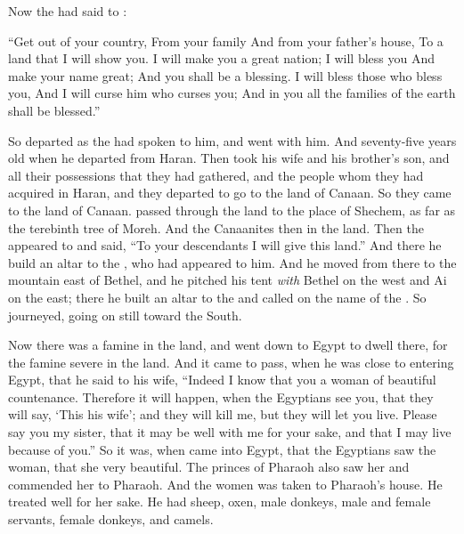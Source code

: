
\bverse Now the \lord had said to :
\begin{bquotation}
``Get out of your country, From your family And from your father's house, To a land that I will show you. \bverse I will make you a great nation; I will bless you And make your name great; And you shall be a blessing. \bverse I will bless those who bless you, And I will curse him who curses you; And in you all the families of the earth shall be blessed.''
\end{bquotation}

\bverse So  departed as the \lord had spoken to him, and  went with him. And  \was seventy-five years old when he departed from Haran.
\bverse Then  took  his wife and  his brother's son, and all their possessions that they had gathered, and the people whom they had acquired in Haran, and they departed to go to the land of Canaan. So they came to the land of Canaan.
\bverse {} passed through the land to the place of Shechem, as far as the terebinth tree of Moreh. And the Canaanites \were then in the land.
\bverse Then the \lord appeared to  and said, ``To your descendants I will give this land.'' And there he build an altar to the \lord, who had appeared to him.
\bverse And he moved from there to the mountain east of Bethel, and he pitched his tent \textit{with} Bethel on the west and Ai on the east; there he built an altar to the \lord and called on the name of the \lord.
\bverse So  journeyed, going on still toward the South.


\bverse Now there was a famine in the land, and  went down to Egypt to dwell there, for the famine \was severe in the land.
\bverse And it came to pass, when he was close to entering Egypt, that he said to  his wife, ``Indeed I know that you \are a woman of beautiful countenance.
\bverse Therefore it will happen, when the Egyptians see you, that they will say, `This \is his wife'; and they will kill me, but they will let you live.
\bverse Please say you \are my sister, that it may be well with me for your sake, and that I may live because of you.''
\bverse So it was, when  came into Egypt, that the Egyptians saw the woman, that she \was very beautiful.
\bverse The princes of Pharaoh also saw her and commended her to Pharaoh. And the women was taken to Pharaoh's house.
\bverse He treated  well for her sake. He had sheep, oxen, male donkeys, male and female servants, female donkeys, and camels.


